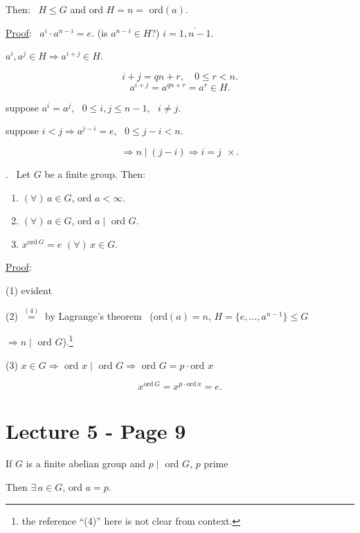 \noindent Then: \ $H\leq G$ and ord $H=n=$ ord$(a)$.

\bigskip
\noindent\underline{Proof}: \ $a^i\cdot a^{n-i}=e$. \quad (is $a^{n-i}\in H$?) \quad $i=\overline{1,n-1}$.

\bigskip
\noindent $a^i,a^j\in H \Rightarrow a^{i+j}\in H$.

\[
i+j=qn+r, \quad 0\leq r<n.
\]
\[
a^{i+j}=a^{qn+r}=a^r\in H.
\]

\bigskip
\noindent suppose $a^i=a^j$, \ $0\leq i,j\leq n-1$, \ $i\neq j$.

\noindent suppose $i<j \Rightarrow a^{j-i}=e$, \ $0\leq j-i<n$.

\[
\Rightarrow n\mid(j-i) \Rightarrow i=j \ \ \times.
\]

\bigskip
\noindent{}. \ Let $G$ be a finite group. Then:

\begin{enumerate}
\item[(1)] $(\forall)\,a\in G$, ord $a<\infty$.
\item[(2)] $(\forall)\,a\in G$, ord $a\mid$ ord $G$.
\item[(3)] $x^{\text{ord}\,G}=e$ $(\forall)\,x\in G$.
\end{enumerate}

\bigskip
\noindent\underline{Proof}:

\noindent (1) evident

\noindent (2) $\overset{(4)}{=}$ by Lagrange's theorem \ (ord$(a)=n$, $H=\{e,\ldots,a^{n-1}\}\leq G$

\noindent $\Rightarrow n\mid$ ord $G$).\footnote{the reference ``(4)'' here is not clear from context.}

\bigskip
\noindent (3) $x\in G \Rightarrow$ ord $x\mid$ ord $G \Rightarrow$ ord $G = p\cdot$ord $x$

\[
x^{\text{ord}\,G} = x^{p\cdot\text{ord}\,x} = e.
\]



\section*{Lecture 5 - Page 9}

\begin{center}
\end{center}

\bigskip
\noindent If $G$ is a finite abelian group and $p\mid$ ord $G$, $p$ prime

\noindent Then $\exists\, a\in G$, ord $a=p$.

